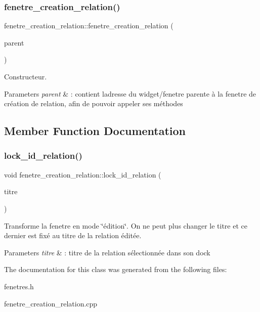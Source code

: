 \subsubsection{\texorpdfstring{fenetre\+\_\+creation\+\_\+relation()}{fenetre\_creation\_relation()}}
{\footnotesize\ttfamily fenetre\+\_\+creation\+\_\+relation\+::fenetre\+\_\+creation\+\_\+relation (\begin{DoxyParamCaption}\item[{Q\+Widget $\ast$}]{parent }\end{DoxyParamCaption})}



Constructeur. 


\begin{DoxyParams}{Parameters}
{\em parent} & \+: contient l\textquotesingle{}adresse du widget/fenetre parente à la fenetre de création de relation, afin de pouvoir appeler ses méthodes \\
\hline
\end{DoxyParams}


\subsection{Member Function Documentation}
\mbox{\label{classfenetre__creation__relation_a83c62031d4d8d973aca33e38d9079c49}} 
\subsubsection{\texorpdfstring{lock\+\_\+id\+\_\+relation()}{lock\_id\_relation()}}
{\footnotesize\ttfamily void fenetre\+\_\+creation\+\_\+relation\+::lock\+\_\+id\+\_\+relation (\begin{DoxyParamCaption}\item[{std\+::string}]{titre }\end{DoxyParamCaption})\hspace{0.3cm}{\ttfamily [inline]}}



Transforme la fenetre en mode \char`\"{}édition\char`\"{}. On ne peut plus changer le titre et ce dernier est fixé au titre de la relation éditée. 


\begin{DoxyParams}{Parameters}
{\em titre} & \+: titre de la relation sélectionnée dans son dock \\
\hline
\end{DoxyParams}


The documentation for this class was generated from the following files\+:\begin{DoxyCompactItemize}
\item 
fenetres.\+h\item 
fenetre\+\_\+creation\+\_\+relation.\+cpp\end{DoxyCompactItemize}
